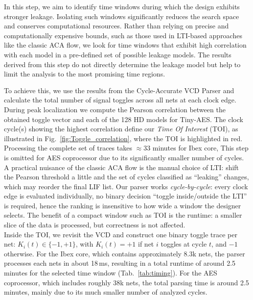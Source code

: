 \documentclass[sigconf]{acmart}
\begin{document}
In this step, we aim to identify time windows during which the design exhibits stronger leakage. Isolating such windows significantly reduces the search space and conserves computational resources. Rather than relying on precise and computationally expensive bounds, such as those used in LTI-based approaches like the classic  
      ACA flow, we look for time windows that exhibit high correlation with 
      each model in a pre-defined set of possible leakage models. 
      The results derived from this step do not directly determine the leakage model but help to limit the analysis to the most promising time regions.

To achieve this, we use the results from the Cycle-Accurate VCD Parser and calculate the total number of signal toggles across all nets at each clock edge. During peak localization we compute the Pearson correlation between the obtained toggle vector and each of the 128 HD models for Tiny-AES. The clock cycle(s) showing the highest correlation define our \emph{Time Of Interest} (TOI), as illustrated in Fig.~\ref{fig:Toggle_correlation}, where the TOI is highlighted in red. Processing the complete set of traces takes \(\approx 33\) minutes for Ibex core, This step is omitted for AES coprocessor due to its significantly smaller number of cycles.\\



A practical nuisance of the classic ACA flow is the manual choice of LTI: 
shift the Pearson threshold a little and the set of
cycles classified as “leaking” changes, which may reorder the final LIF
list.  Our parser works \emph{cycle-by-cycle}: every clock edge is evaluated
individually, no binary decision “toggle inside/outside the LTI” is
required, hence the ranking is insensitive to how wide a
window the designer selects.  The benefit of a compact window such as TOI is the
runtime: a smaller slice of the data is processed, but correctness is not
affected.\\


Inside the TOI, we revisit the VCD and construct one binary toggle trace per net:
\(K_i(t) \in \{-1, +1\}\), with \(K_i(t) = +1\) if net \(i\) toggles at cycle \(t\), and \(-1\) otherwise. 
For the Ibex core, which contains approximately 8.3k nets, the parser processes each nets in about 18\,ms, resulting in a total runtime of around 2.5\,minutes for the selected time window (Tab.~\ref{tab:timing}). 
For the AES coprocessor, which includes roughly 38k nets, the total parsing time is around 2.5\,minutes, mainly due to its much smaller number of analyzed cycles.
\end{document}
